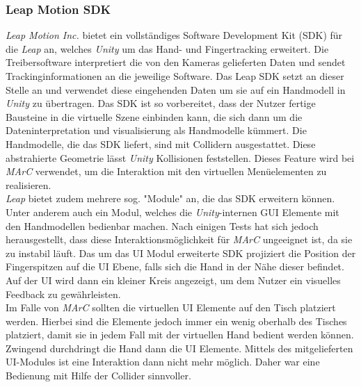 \subsubsection{Leap Motion SDK} \label{sec:LeapSDK}
\textit{Leap Motion Inc.} bietet ein vollständiges Software Development Kit (SDK) für die \textit{Leap} an, welches \textit{Unity} um das Hand- und Fingertracking erweitert. Die Treibersoftware interpretiert die von den Kameras gelieferten Daten und sendet Trackinginformationen an die jeweilige Software. Das Leap SDK setzt an dieser Stelle an und verwendet diese eingehenden Daten um sie auf ein Handmodell in \textit{Unity} zu übertragen. Das SDK ist so vorbereitet, dass der Nutzer fertige Bausteine in die virtuelle Szene einbinden kann, die sich dann um die Dateninterpretation und visualisierung als Handmodelle kümmert. Die Handmodelle, die das SDK liefert, sind mit Collidern ausgestattet. Diese abstrahierte Geometrie lässt \textit{Unity} Kollisionen feststellen. Dieses Feature wird bei \textit{MArC} verwendet, um die Interaktion mit den virtuellen Menüelementen zu realisieren.\\
\textit{Leap} bietet zudem mehrere sog. "Module" an, die das SDK erweitern können. Unter anderem auch ein Modul, welches die \textit{Unity}-internen GUI Elemente mit den Handmodellen bedienbar machen. Nach einigen Tests hat sich jedoch herausgestellt, dass diese Interaktionsmöglichkeit für \textit{MArC} ungeeignet ist, da sie zu instabil läuft. Das um das UI Modul erweiterte SDK projiziert die Position der Fingerspitzen auf die UI Ebene, falls sich die Hand in der Nähe dieser befindet. Auf der UI wird dann ein kleiner Kreis angezeigt, um dem Nutzer ein visuelles Feedback zu gewährleisten.\\
Im Falle von \textit{MArC} sollten die virtuellen UI Elemente auf den Tisch platziert werden. Hierbei sind die Elemente jedoch immer ein wenig oberhalb des Tisches platziert, damit sie in jedem Fall mit der virtuellen Hand bedient werden können. Zwingend durchdringt die Hand dann die UI Elemente. Mittels des mitgelieferten UI-Modules ist eine Interaktion dann nicht mehr möglich. Daher war eine Bedienung mit Hilfe der Collider sinnvoller.

\newpage
